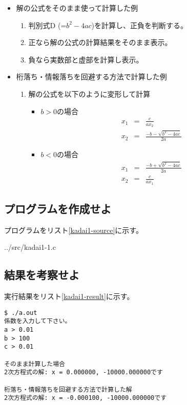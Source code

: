 \documentclass[]{jsarticle}
\begin{document}
\begin{itemize}
\item 解の公式をそのまま使って計算した例
\begin{enumerate}
\item 判別式D (=$b^{2}-4ac$)を計算し、正負を判断する。
\item 正なら解の公式の計算結果をそのまま表示。
\item 負なら実数部と虚部を計算し表示。
\end{enumerate}

\item 桁落ち・情報落ちを回避する方法で計算した例
\begin{enumerate}
\item 解の公式を以下のように変形して計算
\begin{itemize}
\item $b>0$の場合
\begin{eqnarray}
x_{1} &=& \frac{c}{ax_{2}} \\
x_{2} &=& \frac{-b - \sqrt{b^{2}-4ac}}{2a}
\end{eqnarray}
\item $b<0$の場合
\begin{eqnarray}
x_{1} &=& \frac{-b + \sqrt{b^{2}-4ac}}{2a} \\
x_{2} &=& \frac{c}{ax_{1}}
\end{eqnarray}
\end{itemize}

\end{enumerate}

\end{itemize}


\subsection{プログラムを作成せよ}

プログラムをリスト\ref{kadai1-source}に示す。


{../src/kadai1-1.c}


\subsection{結果を考察せよ}

実行結果をリスト\ref{kadai1-result}に示す。

\begin{lstlisting}[caption=実行結果,label=kadai1-result]
$ ./a.out
係数を入力して下さい。
a > 0.01
b > 100
c > 0.01

そのまま計算した場合
2次方程式の解: x = 0.000000, -10000.000000です

桁落ち・情報落ちを回避する方法で計算した解
2次方程式の解: x = -0.000100, -10000.000000です
\end{lstlisting}
\end{document}
